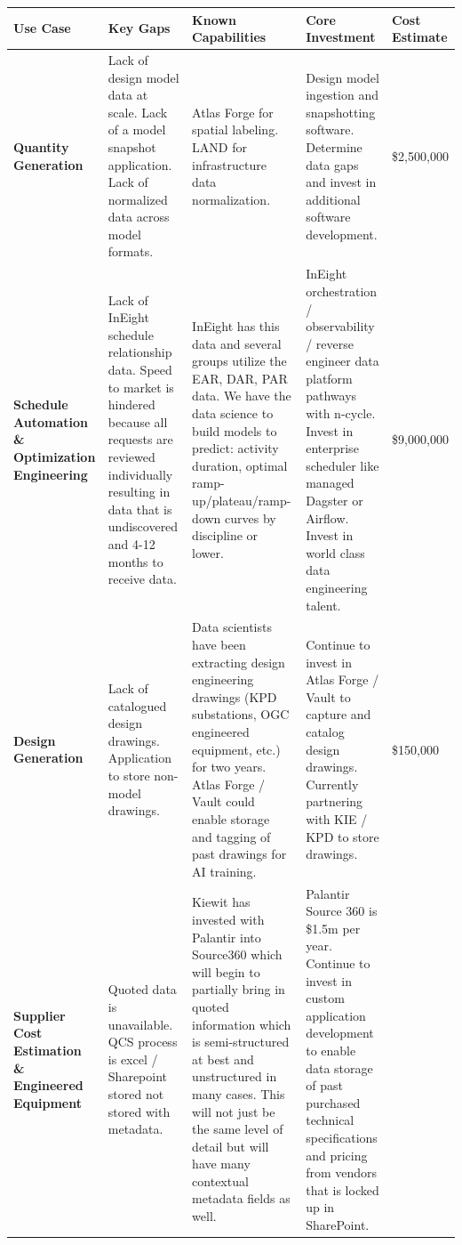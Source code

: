 \documentclass[12pt, a4paper]{article}
\begin{document}
{\footnotesize
\renewcommand{\arraystretch}{1.3}
\begin{tabularx}{\textwidth}{@{}
  >{\raggedright\arraybackslash}p{2.2cm}
  >{\raggedright\arraybackslash}p{3.2cm}
  >{\raggedright\arraybackslash}p{4.61cm}
  >{\raggedright\arraybackslash}p{3.5cm}
  >{\raggedright\arraybackslash}p{0.96cm}@{}}
\toprule
\textbf{Use Case} & \textbf{Key Gaps} & \textbf{Known Capabilities} & \textbf{Core Investment} & \textbf{Cost Estimate} \\
\midrule

\textbf{Quantity Generation} &
Lack of design model data at scale. Lack of a model snapshot application. Lack of normalized data across model formats. &
Atlas Forge for spatial labeling. LAND for infrastructure data normalization. &
Design model ingestion and snapshotting software. Determine data gaps and invest in additional software development. &
\$2,500,000 \\
\midrule

\textbf{Schedule Automation \& Optimization Engineering} &
Lack of InEight schedule relationship data. Speed to market is hindered because all requests are reviewed individually resulting in data that is undiscovered and 4-12 months to receive data. &
InEight has this data and several groups utilize the EAR, DAR, PAR data. We have the data science to build models to predict: activity duration, optimal ramp-up/plateau/ramp-down curves by discipline or lower. &
InEight orchestration / observability / reverse engineer data platform pathways with n-cycle. Invest in enterprise scheduler like managed Dagster or Airflow. Invest in world class data engineering talent. &
\$9,000,000 \\
\midrule

\textbf{Design Generation} &
Lack of catalogued design drawings. Application to store non-model drawings. &
Data scientists have been extracting design engineering drawings (KPD substations, OGC engineered equipment, etc.) for two years. Atlas Forge / Vault could enable storage and tagging of past drawings for AI training. &
Continue to invest in Atlas Forge / Vault to capture and catalog design drawings. Currently partnering with KIE / KPD to store drawings. &
\$150,000 \\
\midrule

\textbf{Supplier Cost Estimation \& Engineered Equipment} &
Quoted data is unavailable. QCS process is excel / Sharepoint stored not stored with metadata. &
Kiewit has invested with Palantir into Source360 which will begin to partially bring in quoted information which is semi-structured at best and unstructured in many cases. This will not just be the same level of detail but will have many contextual metadata fields as well. &
Palantir Source 360 is \$1.5m per year. Continue to invest in custom application development to enable data storage of past purchased technical specifications and pricing from vendors that is locked up in SharePoint. &
\\
\midrule


\end{tabularx}}
\end{document}
